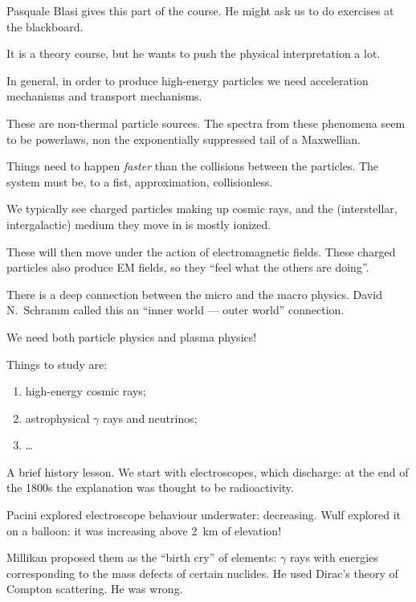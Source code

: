 \documentclass[main.tex]{subfiles}
\begin{document}

Pasquale Blasi gives this part of the course. 
He might ask us to do exercises at the blackboard. 

It is a theory course, but he wants to push the physical interpretation
a lot. 

In general, in order to produce high-energy particles we need 
acceleration mechanisms and transport mechanisms. 

These are non-thermal particle sources. 
The spectra from these phenomena seem to be powerlaws, non 
the exponentially suppressed tail of a Maxwellian.

Things need to happen \emph{faster} than the collisions between the particles. 
The system must be, to a fist, approximation, collisionless. 

We typically see charged particles making up cosmic rays, 
and the (interstellar, intergalactic) medium they move in is mostly ionized. 

These will then move under the action of electromagnetic fields. 
These charged particles also produce EM fields, so they 
``feel what the others are doing''. 

There is a deep connection between the micro and the macro physics. 
David N.\ Schramm called this an ``inner world --- outer world'' connection. 

We need both particle physics and plasma physics! 

Things to study are: 
\begin{enumerate}
    \item high-energy cosmic rays;
    \item astrophysical \(\gamma \) rays and neutrinos;
    \item \dots
\end{enumerate}

A brief history lesson. We start with electroscopes, which discharge: 
at the end of the 1800s the explanation was thought to be radioactivity. 

Pacini explored electroscope behaviour underwater: decreasing. 
Wulf explored it on a balloon: it was increasing above \SI{2}{km} of elevation! 

Millikan proposed them as the ``birth cry'' of elements: \(\gamma \) rays with energies
corresponding to the mass defects of certain nuclides. 
He used Dirac's theory of Compton scattering. He was wrong.
\end{document}
